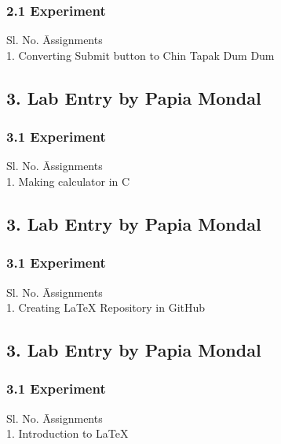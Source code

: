 \documentclass[a4paper,12pt]{article}
\begin{document}
\subsubsection*{2.1 Experiment}
\begin{tabbing}
    Sl. No. \hspace{2cm} \= Assignments \\
    1. \> Converting Submit button to Chin Tapak Dum Dum \\
\end{tabbing}

\subsection*{3. Lab Entry by Papia Mondal}
\subsubsection*{3.1 Experiment}
\begin{tabbing}
    Sl. No. \hspace{2cm} \= Assignments \\
    1. \> Making calculator in C \\
\end{tabbing}

\subsection*{3. Lab Entry by Papia Mondal}
\subsubsection*{3.1 Experiment}
\begin{tabbing}
    Sl. No. \hspace{2cm} \= Assignments \\
    1. \> Creating LaTeX Repository in GitHub \\
\end{tabbing}

\subsection*{3. Lab Entry by Papia Mondal}
\subsubsection*{3.1 Experiment}
\begin{tabbing}
    Sl. No. \hspace{2cm} \= Assignments \\
    1. \> Introduction to LaTeX \\
\end{tabbing}
\end{document}
